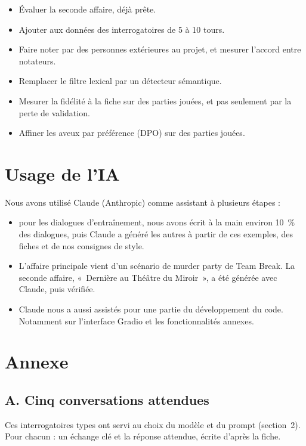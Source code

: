 \documentclass[11pt,a4paper]{article}
\begin{document}
\begin{itemize}
  \item Évaluer la seconde affaire, déjà prête.
  \item Ajouter aux données des interrogatoires de 5 à 10 tours.
  \item Faire noter par des personnes extérieures au projet, et mesurer l'accord entre notateurs.
  \item Remplacer le filtre lexical par un détecteur sémantique.
  \item Mesurer la fidélité à la fiche sur des parties jouées, et pas seulement par la perte de validation.
  \item Affiner les aveux par préférence (DPO) sur des parties jouées.
\end{itemize}

\section*{Usage de l'IA}

Nous avons utilisé Claude (Anthropic) comme assistant à plusieurs étapes :
\begin{itemize}
  \item pour les dialogues d'entraînement, nous avons écrit à la main environ 10~\% des dialogues, puis Claude a généré les autres à partir de ces exemples, des fiches et de nos consignes de style.
  \item L'affaire principale vient d'un scénario de murder party de Team Break. La seconde affaire, «~Dernière au Théâtre du Miroir~», a été générée avec Claude, puis vérifiée.
  \item Claude nous a aussi assistés pour une partie du développement du code. Notamment sur l'interface Gradio et les fonctionnalités annexes.
\end{itemize}


\appendix
\section*{Annexe}

\subsection*{A. Cinq conversations attendues}

Ces interrogatoires types ont servi au choix du modèle et du prompt (section~2). Pour chacun : un échange clé et la réponse attendue, écrite d'après la fiche.
\end{document}
